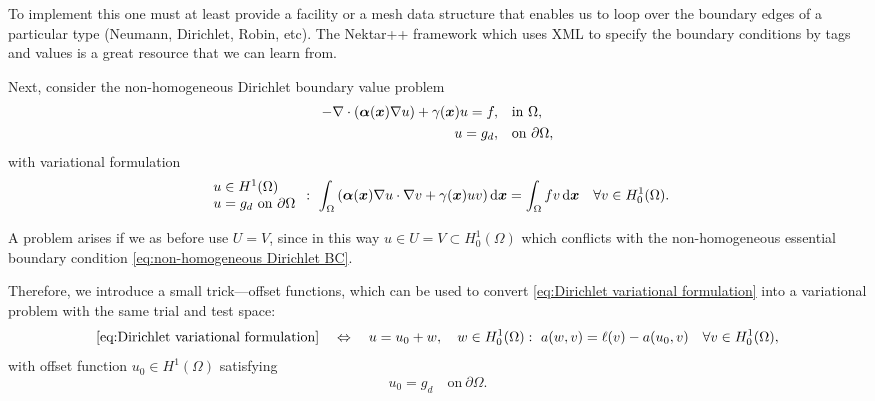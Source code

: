 	To implement this one must at least provide a facility or a mesh data 
	structure that enables us to loop over the boundary edges of a particular
	type (Neumann, Dirichlet, Robin, etc). The Nektar++ framework which uses 
	XML to specify the boundary conditions by tags and values \cite{Netkar++}
	is a great resource that we can learn from.
	
	Next, consider the non-homogeneous Dirichlet boundary value problem
	\begin{align}
		-\nabla\cdot(\bm{\alpha}(\bm{x}) \nabla u)+
		\gamma(\bm{x})u=f, \quad &\textrm{in }\Omega,
		\label{eq:Dirichlet PDE} \\
		u=g_d, \quad &\textrm{on }\partial\Omega,
		\label{eq:non-homogeneous Dirichlet BC}
	\end{align}
	with variational formulation
	\begin{equation}\label{eq:Dirichlet variational formulation}
		\begin{array}{l}			
			u\in H^1(\Omega)\\
			u=g_d \textrm{ on }\partial\Omega
		\end{array}:\ 
		\int_{\Omega}\left(\bm{\alpha}(\bx)\nabla u\cdot\nabla v+
		\gamma(\bx)uv\right)\dx = 
		\int_{\Omega}fv\,\dx \quad\forall v\in H_0^1(\Omega).
	\end{equation}

	A problem arises if we as before use $U=V$, since in this way 
	$u\in U=V\subset H_0^1(\Omega)$ which conflicts with the non-homogeneous
	essential boundary condition \eqref{eq:non-homogeneous Dirichlet BC}.
	
	Therefore, we introduce a small trick---offset functions, which can be
	used to convert \eqref{eq:Dirichlet variational formulation} into a 
	variational problem with the same trial and test space:
	\begin{equation}
		\eqref{eq:Dirichlet variational formulation} \quad\Leftrightarrow\quad
		u=u_0+w,\quad w\in H_0^1(\Omega):\ a(w,v)=\ell(v)-a(u_0,v) \quad
		\forall v\in H_0^1(\Omega),
	\end{equation}
	with offset function $u_0\in H^1(\Omega)$ satisfying 
	\begin{equation}
		 u_0 = g_d \quad \textrm{on}\ \partial\Omega.
	\end{equation}
	
